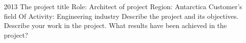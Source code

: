 \documentclass[print]{friggeri-cv} %
\begin{document}
\begin{entrylist}

\entry
{2013}
{The project title}
{Role: }{Architect of project}
{Region: }{Antarctica}
{Customer's field Of Activity: }{Engineering industry}
{
Describe the project and its objectives. Describe your work in the project. What results have been achieved in the project?
}

\end{entrylist}

\end{document}

